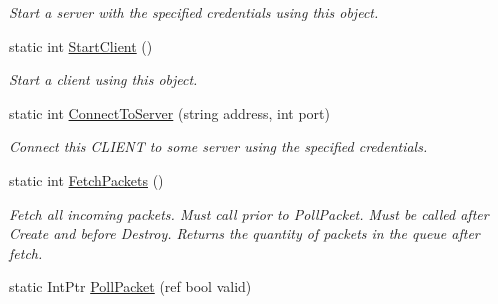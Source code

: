\begin{DoxyCompactItemize}
\begin{DoxyCompactList}\small\item\em Start a server with the specified credentials using this object. \end{DoxyCompactList}\item 
\hypertarget{class_champ_net_plugin_1_1_network_acaf000c31710d5c8f2720a6143773c4d}{static int \hyperlink{class_champ_net_plugin_1_1_network_acaf000c31710d5c8f2720a6143773c4d}{Start\-Client} ()}\label{class_champ_net_plugin_1_1_network_acaf000c31710d5c8f2720a6143773c4d}

\begin{DoxyCompactList}\small\item\em Start a client using this object. \end{DoxyCompactList}\item 
\hypertarget{class_champ_net_plugin_1_1_network_a82f643f5065fc2d081be45de41e89aff}{static int \hyperlink{class_champ_net_plugin_1_1_network_a82f643f5065fc2d081be45de41e89aff}{Connect\-To\-Server} (string address, int port)}\label{class_champ_net_plugin_1_1_network_a82f643f5065fc2d081be45de41e89aff}

\begin{DoxyCompactList}\small\item\em Connect this C\-L\-I\-E\-N\-T to some server using the specified credentials. \end{DoxyCompactList}\item 
\hypertarget{class_champ_net_plugin_1_1_network_a591fc1d265a3d980b5ea185100e1a3c9}{static int \hyperlink{class_champ_net_plugin_1_1_network_a591fc1d265a3d980b5ea185100e1a3c9}{Fetch\-Packets} ()}\label{class_champ_net_plugin_1_1_network_a591fc1d265a3d980b5ea185100e1a3c9}

\begin{DoxyCompactList}\small\item\em Fetch all incoming packets. Must call prior to Poll\-Packet. Must be called after Create and before Destroy. Returns the quantity of packets in the queue after fetch. \end{DoxyCompactList}\item 
\hypertarget{class_champ_net_plugin_1_1_network_aa7cd4d50064649ad52aa1d4b4c43af3a}{static Int\-Ptr \hyperlink{class_champ_net_plugin_1_1_network_aa7cd4d50064649ad52aa1d4b4c43af3a}{Poll\-Packet} (ref bool valid)}\label{class_champ_net_plugin_1_1_network_aa7cd4d50064649ad52aa1d4b4c43af3a}


\end{DoxyCompactItemize}
